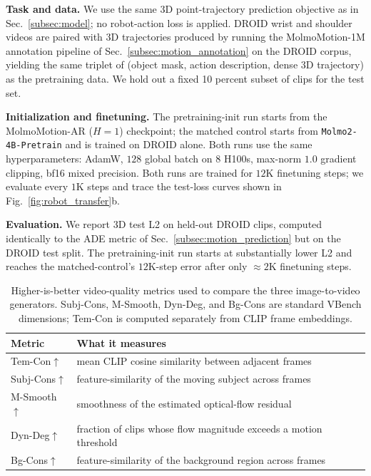 \documentclass{llmxive}
\begin{document}
\noindent\textbf{Task and data.}
We use the same 3D point-trajectory prediction objective as in
Sec.~\ref{subsec:model}; no robot-action loss is applied. DROID wrist and
shoulder videos are paired with 3D trajectories produced by running the
MolmoMotion-1M annotation pipeline of Sec.~\ref{subsec:motion_annotation} on
the DROID corpus, yielding the same triplet of (object mask, action
description, dense 3D trajectory) as the pretraining data. We hold out a fixed 10 percent subset of clips for the test set.

\noindent\textbf{Initialization and finetuning.}
The pretraining-init run starts from the MolmoMotion-AR ($H=1$) checkpoint; the matched control starts
from \texttt{Molmo2-4B-Pretrain} and is trained on DROID alone. Both runs use
the same hyperparameters:
AdamW, $128$ global batch on $8$ H100s, max-norm $1.0$ gradient clipping,
bf16 mixed precision. Both runs are trained for $12$K finetuning steps; we
evaluate every $1$K steps and trace the test-loss curves shown in
Fig.~\ref{fig:robot_transfer}b.

\noindent\textbf{Evaluation.}
We report 3D test L2 on held-out DROID clips, computed identically to the
ADE metric of Sec.~\ref{subsec:motion_prediction} but on the DROID test
split. The pretraining-init run starts at substantially lower L2 and reaches
the matched-control's $12$K-step error after only $\approx 2$K finetuning
steps.



\begin{table}[t]
  \centering
  \small
  \setlength{\tabcolsep}{6pt}
  \begin{tabular}{ll}
    Metric              & What it measures \\
    \midrule
    Tem-Con$\uparrow$   & mean CLIP cosine similarity between adjacent frames \\
    Subj-Cons$\uparrow$ & feature-similarity of the moving subject across frames \\
    M-Smooth$\uparrow$  & smoothness of the estimated optical-flow residual \\
    Dyn-Deg$\uparrow$   & fraction of clips whose flow magnitude exceeds a motion threshold \\
    Bg-Cons$\uparrow$   & feature-similarity of the background region across frames \\
  \end{tabular}
  \vspace{2mm}
  \caption{Higher-is-better video-quality metrics used to compare the three image-to-video generators. Subj-Cons, M-Smooth, Dyn-Deg, and Bg-Cons are standard VBench dimensions; Tem-Con is computed separately from CLIP frame embeddings.}
  \label{tab:vidgen-metrics}
\end{table}
\end{document}
